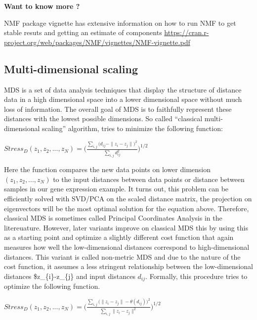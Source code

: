 \documentclass[12pt,]{krantz}
\theoremstyle{definition}
\theoremstyle{definition}
\theoremstyle{definition}
\theoremstyle{remark}
\let\BeginKnitrBlock\begin \let\EndKnitrBlock\end
\begin{document}
\BeginKnitrBlock{rmdtip}
\textbf{Want to know more ?}

NMF package vignette has extensive information on how to run NMF to get
stable resuts and getting an estimate of components
\url{https://cran.r-project.org/web/packages/NMF/vignettes/NMF-vignette.pdf}
\EndKnitrBlock{rmdtip}

\hypertarget{multi-dimensional-scaling}{%
\subsection{Multi-dimensional scaling}\label{multi-dimensional-scaling}}

MDS is a set of data analysis techniques that display the structure of
distance data in a high dimensional space into a lower dimensional space
without much loss of information. The overall goal of MDS is to
faithfully represent these distances with the lowest possible
dimensions. So called ``classical multi-dimensional scaling'' algorithm,
tries to minimize the following function:

\({\displaystyle Stress_{D}(z_{1},z_{2},...,z_{N})={\Biggl (}{\frac {\sum _{i,j}{\bigl (}d_{ij}-\|z_{i}-z_{j}\|{\bigr )}^{2}}{\sum _{i,j}d_{ij}^{2}}}{\Biggr )}^{1/2}}\)

Here the function compares the new data points on lower dimension
\((z_{1},z_{2},...,z_{N})\) to the input distances between data points
or distance between samples in our gene expression example. It turns
out, this problem can be efficiently solved with SVD/PCA on the scaled
distance matrix, the projection on eigenvectors will be the most optimal
solution for the equation above. Therefore, classical MDS is sometimes
called Principal Coordinates Analysis in the litereuature. However,
later variants improve on classical MDS this by using this as a starting
point and optimize a slightly different cost function that again
measures how well the low-dimensional distances correspond to
high-dimensional distances. This variant is called non-metric MDS and
due to the nature of the cost function, it assumes a less stringent
relationship between the low-dimensional distances
\$\textbar{}z\_\{i\}-z\_\{j\}\textbar{} and input distances \(d_{ij}\).
Formally, this procedure tries to optimize the following function.

\({\displaystyle Stress_{D}(z_{1},z_{2},...,z_{N})={\Biggl (}{\frac {\sum _{i,j}{\bigl (}\|z_{i}-z_{j}\|-\theta(d_{ij}){\bigr )}^{2}}{\sum _{i,j}\|z_{i}-z_{j}\|^{2}}}{\Biggr )}^{1/2}}\)
\end{document}
